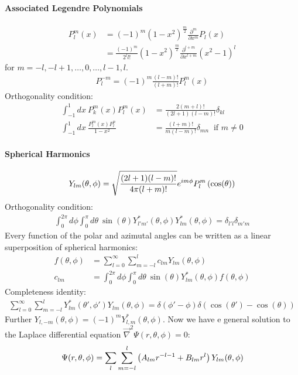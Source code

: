 \paragraph{Associated Legendre Polynomials}
\begin{align*}
    P_l^m (x) &= (-1)^m (1-x^2)^{\frac{m}{2}} \frac{\partial^m}{\partial x^m} P_l (x)
    \\
    &= \frac{(-1)^m}{2^l l!} (1-x^2)^{\frac{m}{2}} \frac{\partial^{l+m}}{\partial x^{l+m}} (x^2 - 1)^l
\end{align*}
for $m = -l,-l+1,\dots,0,\dots,l-1,l$.
\begin{align*}
    P_l^{-m} = (-1)^m \frac{(l-m)!}{(l+m)!} P_l^m (x)
\end{align*}
Orthogonality condition:
\begin{align*}
    \int_{-1}^1 dx \ P_k^m (x) P_l^m (x) &= \frac{2(m+l)!}{(2l+1)(l-m)!} \delta_{kl}
    \\
    \int_{-1}^1 dx \ \frac{P_l^m (x) P_l^n}{1-x^2} &= \frac{(l+m)!}{m(l-m)!} \delta_{mn}
    \ \text{ if } m \neq 0
\end{align*}

\paragraph{Spherical Harmonics}
\begin{align*}
    Y_{lm} (\theta,\phi) = \sqrt{\frac{(2l+1) (l-m)!}{4 \pi (l+m)!}} e^{i m \phi} P_l^m \left( \cos(\theta) \right)
\end{align*}
Orthogonality condition:
\begin{align*}
    \int_0^{2 \pi} d \phi \int_0^\pi d \theta \ \sin(\theta) Y_{l'm'}^\ast (\theta,\phi) Y_{lm}^\ast (\theta,\phi) = \delta_{l'l} \delta_{m'm}
\end{align*}
Every function of the polar and azimutal angles can be written as a linear
superposition of spherical harmonics:
\begin{align*}
    f(\theta,\phi) &= \sum_{l=0}^\infty \sum_{m=-l}^l c_{lm} Y_{lm} (\theta,\phi)
    \\
    c_{lm} &= \int_0^{2 \pi} d \phi \int_0^\pi d \theta \ \sin(\theta) Y_{lm}^\ast (\theta,\phi) f(\theta,\phi)
\end{align*}
Completeness identity:
\begin{align*}
    \sum_{l=0}^\infty \sum_{m=-l}^l Y_{lm}^\ast (\theta' , \phi') Y_{lm} (\theta,\phi)
    = \delta(\phi' - \phi) \delta(\cos(\theta') - \cos(\theta))
\end{align*}
Further $Y_{l,-m}(\theta,\phi) = (-1)^m Y_{l,m}^\ast (\theta,\phi)$.
Now we have e general solution to the Laplace differential equation
$\vec{\nabla}^2 \Psi (r,\theta,\phi) = 0$:
\begin{align*}
    \Psi(r,\theta,\phi) = \sum_l \sum_{m=-l}^l \left( A_{lm} r^{-l-1} + B_{lm} r^l \right) Y_{lm} (\theta,\phi)
\end{align*}


